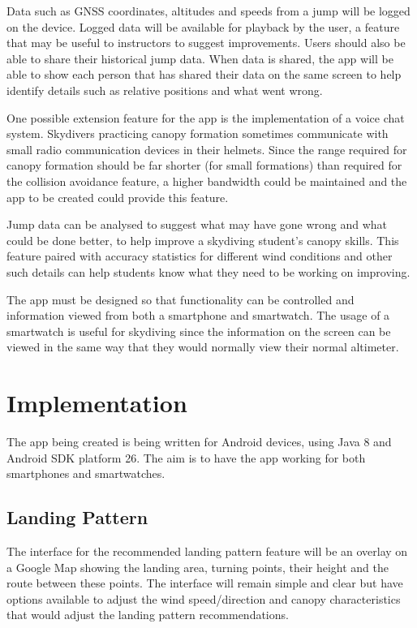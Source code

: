 \documentclass[11pt, a4paper, twocolumn]{article}
\begin{document}
Data such as GNSS coordinates, altitudes and speeds from a jump will be logged on the device. Logged data will be available for playback by the user, a feature that may be useful to instructors to suggest improvements. Users should also be able to share their historical jump data. When data is shared, the app will be able to show each person that has shared their data on the same screen to help identify details such as relative positions and what went wrong.

One possible extension feature for the app is the implementation of a voice chat system. Skydivers practicing canopy formation sometimes communicate with small radio communication devices in their helmets. Since the range required for canopy formation should be far shorter (for small formations) than required for the collision avoidance feature, a higher bandwidth could be maintained and the app to be created could provide this feature.

Jump data can be analysed to suggest what may have gone wrong and what could be done better, to help improve a skydiving student's canopy skills. This feature paired with accuracy statistics for different wind conditions and other such details can help students know what they need to be working on improving.

The app must be designed so that functionality can be controlled and information viewed from both a smartphone and smartwatch. The usage of a smartwatch is useful for skydiving since the information on the screen can be viewed in the same way that they would normally view their normal altimeter.

\section{Implementation}\label{sec:implementation} %
The app being created is being written for Android devices, using Java 8 and Android SDK platform 26. The aim is to have the app working for both smartphones and smartwatches.

\subsection{Landing Pattern} %
The interface for the recommended landing pattern feature will be an overlay on a Google Map showing the landing area, turning points, their height and the route between these points. The interface will remain simple and clear but have options available to adjust the wind speed/direction and canopy characteristics that would adjust the landing pattern recommendations.
\end{document}
